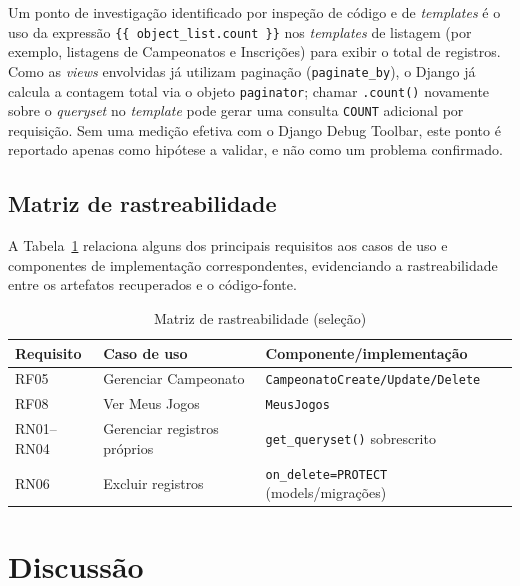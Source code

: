 \documentclass[12pt]{article}
\begin{document}
Um ponto de investigação identificado por inspeção de código e de
\emph{templates} é o uso da expressão \texttt{\{\{ object\_list.count \}\}}
nos \emph{templates} de listagem (por exemplo, listagens de Campeonatos e
Inscrições) para exibir o total de registros. Como as \emph{views} envolvidas
já utilizam paginação (\texttt{paginate\_by}), o Django já calcula a
contagem total via o objeto \texttt{paginator}; chamar \texttt{.count()}
novamente sobre o \emph{queryset} no \emph{template} pode gerar uma consulta
\texttt{COUNT} adicional por requisição. Sem uma medição efetiva com o
Django Debug Toolbar, este ponto é reportado apenas como hipótese a validar,
e não como um problema confirmado.

\subsection{Matriz de rastreabilidade}

A Tabela~\ref{tab:rastreabilidade} relaciona alguns dos principais
requisitos aos casos de uso e componentes de implementação correspondentes,
evidenciando a rastreabilidade entre os artefatos recuperados e o código-fonte.

\begin{table}[ht]
\centering
\caption{Matriz de rastreabilidade (seleção)}
\label{tab:rastreabilidade}
\small
\begin{tabular}{@{}p{1.3cm}p{2.6cm}p{3.6cm}@{}}
\toprule
\textbf{Requisito} & \textbf{Caso de uso} & \textbf{Componente/implementação} \\
\midrule
RF05 & Gerenciar Campeonato & \texttt{CampeonatoCreate/Update/Delete} \\
RF08 & Ver Meus Jogos & \texttt{MeusJogos} \\
RN01--RN04 & Gerenciar registros próprios & \texttt{get\_queryset()} sobrescrito \\
RN06 & Excluir registros & \texttt{on\_delete=PROTECT} (models/migrações) \\
\bottomrule
\end{tabular}
\end{table}

\section{Discussão}
\label{sec:discussao}
\end{document}
